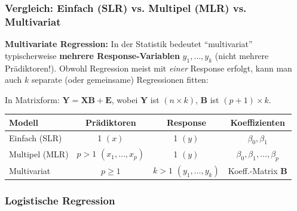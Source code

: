 
\subsubsection{Vergleich: Einfach (SLR) vs. Multipel (MLR) vs. Multivariat}

\textbf{Multivariate Regression:} In der Statistik bedeutet ``multivariat'' typischerweise \textbf{mehrere Response-Variablen} $y_1, \ldots, y_k$ (nicht mehrere Prädiktoren!). Obwohl Regression meist mit \textit{einer} Response erfolgt, kann man auch $k$ separate (oder gemeinsame) Regressionen fitten:

In Matrixform: $\mathbf{Y} = \mathbf{X} \mathbf{B} + \mathbf{E}$, wobei $\mathbf{Y}$ ist $(n \times k)$, $\mathbf{B}$ ist $(p+1) \times k$.

\begin{table}[h]
    \centering
    \small
    \begin{tabular}{|l|c|c|c|}
        \hline
        \textbf{Modell} & \textbf{Prädiktoren} & \textbf{Response} & \textbf{Koeffizienten} \\
        \hline
        Einfach (SLR) & 1 $(x)$ & 1 $(y)$ & $\beta_0, \beta_1$ \\
        \hline
        Multipel (MLR) & $p > 1$ $(x_1, \ldots, x_p)$ & 1 $(y)$ & $\beta_0, \beta_1, \ldots, \beta_p$ \\
        \hline
        Multivariat & $p \geq 1$ & $k > 1$ $(y_1, \ldots, y_k)$ & Koeff.-Matrix $\mathbf{B}$ \\
        \hline
    \end{tabular}
\end{table}

\subsubsection{Logistische Regression}

